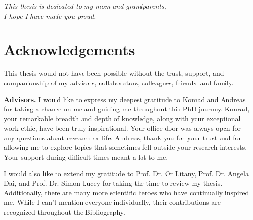 \newpage
\thispagestyle{empty}
\vspace*{\fill}
\begin{center}
    \textit{
    This thesis is dedicated to my mom and grandparents, \\
    I hope I have made you proud.
    }
\end{center}
\vspace*{\fill}



\chapter*{Acknowledgements}
\label{chap:acknowledgements}

This thesis would not have been possible without the trust, support, and companionship of my advisors, collaborators, colleagues, friends, and family.

\noindent
\textbf{Advisors.}
I would like to express my deepest gratitude to Konrad and Andreas for taking a chance on me and guiding me throughout this PhD journey. Konrad, your remarkable breadth and depth of knowledge, along with your exceptional work ethic, have been truly inspirational. Your office door was always open for any questions about research or life. Andreas, thank you for your trust and for allowing me to explore topics that sometimes fell outside your research interests. Your support during difficult times meant a lot to me.

I would also like to extend my gratitude to Prof. Dr. Or Litany, Prof. Dr. Angela Dai, and Prof. Dr. Simon Lucey for taking the time to review my thesis. Additionally, there are many more scientific heroes who have continually inspired me. While I can't mention everyone individually, their contributions are recognized throughout the Bibliography.

